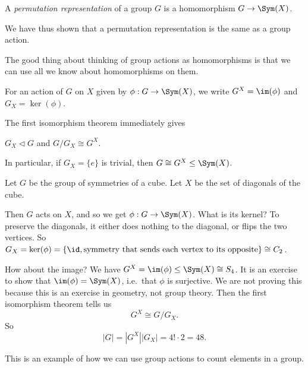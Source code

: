\documentclass[a4paper]{article}
\begin{document}
\begin{defi}
  A \emph{permutation representation} of a group $G$ is a homomorphism $G \to \Sym (X)$.
\end{defi}
We have thus shown that a permutation representation is the same as a group action.

The good thing about thinking of group actions as homomorphisms is that we can use all we know about homomorphisms on them.
\begin{notation}
  For an action of $G$ on $X$ given by $\phi: G \to \Sym(X)$, we write $G^X = \im(\phi)$ and $G_X = \ker(\phi)$.
\end{notation}

The first isomorphism theorem immediately gives
\begin{prop}
  $G_X \lhd G$ and $G/G_X \cong G^X$.
\end{prop}

In particular, if $G_X = \{e\}$ is trivial, then $G \cong G^X \leq \Sym(X)$.

\begin{eg}
  Let $G$ be the group of symmetries of a cube. Let $X$ be the set of diagonals of the cube.
  \begin{center}
  \end{center}
  Then $G$ acts on $X$, and so we get $\phi: G \to \Sym(X)$. What is its kernel? To preserve the diagonals, it either does nothing to the diagonal, or flips the two vertices. So $G_X = \ker(\phi) = \{\id, \text{symmetry that sends each vertex to its opposite}\} \cong C_2$.

  How about the image? We have $G^X = \im(\phi) \leq \Sym(X) \cong S_4$. It is an exercise to show that $\im(\phi) = \Sym(X)$, i.e.\ that $\phi$ is surjective. We are not proving this because this is an exercise in geometry, not group theory. Then the first isomorphism theorem tells us
  \[
    G^X \cong G/G_X.
  \]
  So
  \[
    |G| = |G^X| |G_X| = 4! \cdot 2 = 48.
  \]
\end{eg}
This is an example of how we can use group actions to count elements in a group.
\end{document}
